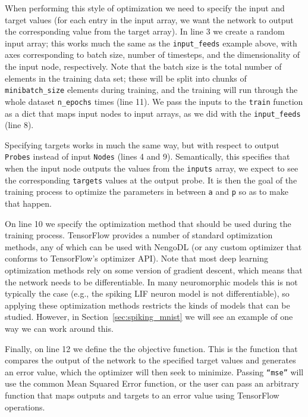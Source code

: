\documentclass{article}
\begin{document}
\lstset{numbers=left}


When performing this style of optimization we need to specify the input and target values (for each entry in the input array, we want the network to output the corresponding value from the target array).  In line 3 we create a random input array; this works much the same as the \texttt{input\_feeds} example above, with axes corresponding to batch size, number of timesteps, and the dimensionality of the input node, respectively.  Note that the batch size is the total number of elements in the training data set; these will be split into chunks of \texttt{minibatch\_size} elements during training, and the training will run through the whole dataset \texttt{n\_epochs} times (line 11).  We pass the inputs to the \texttt{train} function as a dict that maps input nodes to input arrays, as we did with the \texttt{input\_feeds} (line 8).

Specifying targets works in much the same way, but with respect to output \texttt{Probes} instead of input \texttt{Nodes} (lines 4 and 9).  Semantically, this specifies that when the input node outputs the values from the \texttt{inputs} array, we expect to see the corresponding \texttt{targets} values at the output probe.  It is then the goal of the training process to optimize the parameters in between \texttt{a} and \texttt{p} so as to make that happen.

On line 10 we specify the optimization method that should be used during the training process.  TensorFlow provides a number of standard optimization methods, any of which can be used with NengoDL (or any custom optimizer that conforms to TensorFlow's optimizer API).  Note that most deep learning optimization methods rely on some version of gradient descent, which means that the network needs to be differentiable.  In many neuromorphic models this is not typically the case (e.g., the spiking LIF neuron model is not differentiable), so applying these optimization methods restricts the kinds of models that can be studied.  However, in Section~\ref{sec:spiking_mnist} we will see an example of one way we can work around this.

Finally, on line 12 we define the the objective function.  This is the function that compares the output of the network to the specified target values and generates an error value, which the optimizer will then seek to minimize.  Passing \texttt{``mse''} will use the common Mean Squared Error function, or the user can pass an arbitrary function that maps outputs and targets to an error value using TensorFlow operations.
\end{document}
